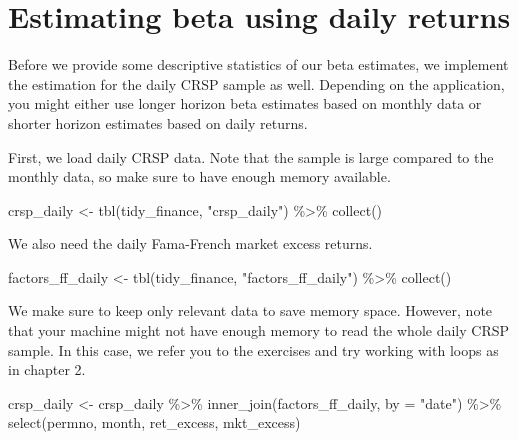 \documentclass[
]{krantz}
\newenvironment{Shaded}{\begin{snugshade}}{\end{snugshade}}
\newcommand{\AttributeTok}[1]{\textcolor[rgb]{0.61,0.61,0.61}{#1}}
\newcommand{\FunctionTok}[1]{\textcolor[rgb]{0,0,0}{#1}}
\newcommand{\NormalTok}[1]{#1}
\newcommand{\OtherTok}[1]{\textcolor[rgb]{0.37,0.37,0.37}{#1}}
\newcommand{\SpecialCharTok}[1]{\textcolor[rgb]{0,0,0}{#1}}
\newcommand{\StringTok}[1]{\textcolor[rgb]{0.5,0.5,0.5}{#1}}
\begin{document}
\hypertarget{estimating-beta-using-daily-returns}{%
\section{Estimating beta using daily returns}\label{estimating-beta-using-daily-returns}}

Before we provide some descriptive statistics of our beta estimates, we implement the estimation for the daily CRSP sample as well.
Depending on the application, you might either use longer horizon beta estimates based on monthly data or shorter horizon estimates based on daily returns.

First, we load daily CRSP data.
Note that the sample is large compared to the monthly data, so make sure to have enough memory available.

\begin{Shaded}
\begin{Highlighting}[]
\NormalTok{crsp\_daily }\OtherTok{\textless{}{-}} \FunctionTok{tbl}\NormalTok{(tidy\_finance, }\StringTok{"crsp\_daily"}\NormalTok{) }\SpecialCharTok{\%\textgreater{}\%}
  \FunctionTok{collect}\NormalTok{()}
\end{Highlighting}
\end{Shaded}

We also need the daily Fama-French market excess returns.

\begin{Shaded}
\begin{Highlighting}[]
\NormalTok{factors\_ff\_daily }\OtherTok{\textless{}{-}} \FunctionTok{tbl}\NormalTok{(tidy\_finance, }\StringTok{"factors\_ff\_daily"}\NormalTok{) }\SpecialCharTok{\%\textgreater{}\%}
  \FunctionTok{collect}\NormalTok{()}
\end{Highlighting}
\end{Shaded}

We make sure to keep only relevant data to save memory space.
However, note that your machine might not have enough memory to read the whole daily CRSP sample. In this case, we refer you to the exercises and try working with loops as in chapter 2.

\begin{Shaded}
\begin{Highlighting}[]
\NormalTok{crsp\_daily }\OtherTok{\textless{}{-}}\NormalTok{ crsp\_daily }\SpecialCharTok{\%\textgreater{}\%}
  \FunctionTok{inner\_join}\NormalTok{(factors\_ff\_daily, }\AttributeTok{by =} \StringTok{"date"}\NormalTok{) }\SpecialCharTok{\%\textgreater{}\%}
  \FunctionTok{select}\NormalTok{(permno, month, ret\_excess, mkt\_excess)}
\end{Highlighting}
\end{Shaded}
\end{document}
